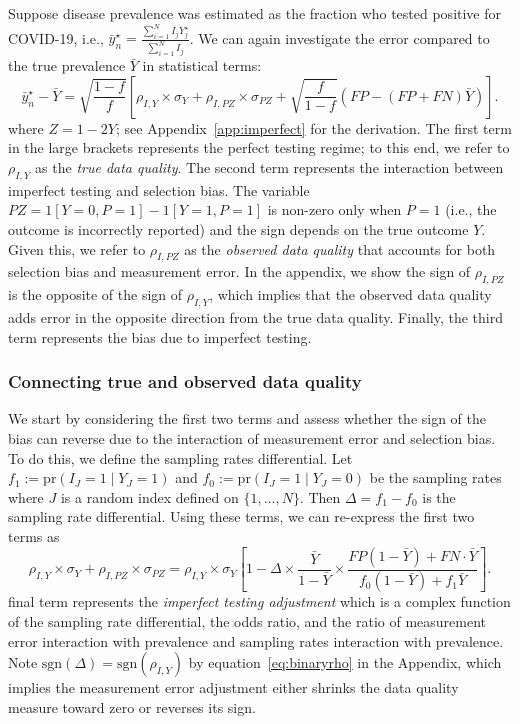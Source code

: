 \documentclass[11pt]{amsart}
\def\pr{\text{pr}}
\def\sgn{\text{sgn}}
\begin{document}
Suppose disease prevalence was estimated as the fraction who tested positive for COVID-19, i.e., $\bar y_n^\star = \frac{\sum_{i=1}^N I_j Y_j^\star}{\sum_{i=1}^N I_j}$.  We can again investigate the error compared to the true prevalence $\bar Y$ in statistical terms:
$$
\bar y_n^\star - \bar Y = \sqrt{\frac{1-f}{f}} \left[ \rho_{I,Y} \times \sigma_Y + \rho_{I,PZ} \times \sigma_{PZ} + \sqrt{\frac{f}{1-f}}  \left( FP - (FP+FN) \bar Y \right) \right] .
$$
where $Z = 1-2Y$; see Appendix~\ref{app:imperfect} for the derivation. The first term in the large brackets represents the perfect testing regime; to this end, we refer to $\rho_{I,Y}$ as the \emph{true data quality}.  The second term represents the interaction between imperfect testing and selection bias. The variable $PZ = 1[Y=0,P=1] - 1[Y=1, P=1]$ is non-zero only when $P=1$ (i.e., the outcome is incorrectly reported) and the sign depends on the true outcome $Y$.  Given this, we refer to $\rho_{I,PZ}$ as the \emph{observed data quality} that accounts for both selection bias and measurement error.  In the appendix, we show the sign of $\rho_{I,PZ}$ is the opposite of the sign of $\rho_{I,Y}$, which implies that the observed data quality adds error in the opposite direction from the true data quality.  Finally, the third term represents the bias due to imperfect testing.

\subsubsection{Connecting true and observed data quality}

We start by considering the first two terms and assess whether the sign of the bias can reverse due to the interaction of measurement error and selection bias.  To do this, we define the sampling rates differential.  Let $f_1 := \pr (I_J = 1 \mid Y_J = 1)$ and $f_0 := \pr(I_J = 1 \mid Y_J = 0)$ be the sampling rates where $J$ is a random index defined on $\{1,\ldots, N\}$.  Then $\Delta = f_1 - f_0$ is the sampling rate differential.  Using these terms, we can re-express the first two terms as
$$
\rho_{I,Y} \times \sigma_Y + \rho_{I,PZ} \times \sigma_{PZ} =
\rho_{I,Y} \times \sigma_Y \left[ 1 - \Delta \times \frac{\bar Y}{1-\bar Y} \times \frac{FP(1-\bar Y) + FN \cdot \bar Y}{f_0 (1-\bar Y) + f_1 \bar Y} \right].
$$
final term represents the \emph{imperfect testing adjustment} which is a complex function of the sampling rate differential, the odds ratio, and the ratio of measurement error interaction with prevalence and sampling rates interaction with prevalence. Note $\sgn(\Delta) = \sgn(\rho_{I,Y})$ by equation~\ref{eq:binaryrho} in the Appendix, which implies the measurement error adjustment either shrinks the data quality measure toward zero or reverses its sign.
\end{document}
